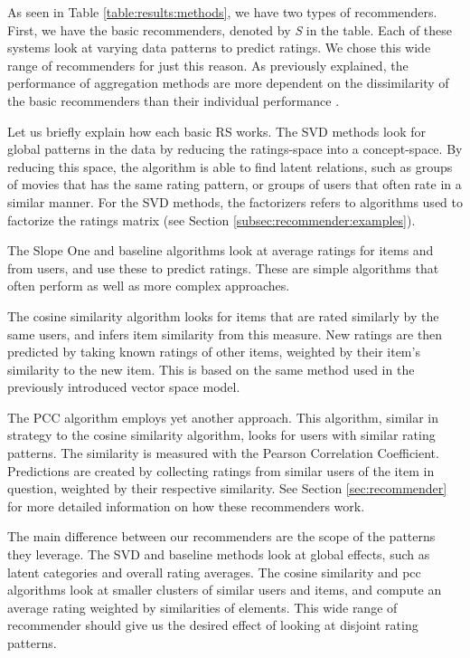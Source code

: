 As seen in Table \ref{table:results:methods}, we have two types of recommenders.
First, we have the basic recommenders, denoted by \emph{S} in the table.
Each of these systems look at varying data patterns to predict ratings.
We chose this wide range of recommenders for just this reason.
As previously explained, the performance of aggregation methods
are more dependent on the dissimilarity of the basic recommenders
than their individual performance \cite[p6]{Bell2007}.

Let us briefly explain how each basic RS works.
The SVD methods look for global patterns in the data 
by reducing the ratings-space into a concept-space.
By reducing this space, the algorithm is able to find
latent relations, such as groups of movies that has the same
rating pattern, or groups of users that often rate in a similar manner.
For the SVD methods, the factorizers refers to algorithms used to factorize the ratings matrix
(see Section \ref{subsec:recommender:examples}).

The Slope One and baseline algorithms look at average
ratings for items and from users, and use these to predict ratings.
These are simple algorithms that often perform as well
as more complex approaches.

The cosine similarity algorithm looks for items that are rated
similarly by the same users, and infers item similarity from this measure.
New ratings are then predicted by taking known ratings of other items,
weighted by their item's similarity to the new item.
This is based on the same method used in the previously introduced vector space model.

The PCC algorithm employs yet another approach. This algorithm,
similar in strategy to the cosine similarity algorithm,
looks for users with similar rating patterns.
The similarity is measured with the Pearson Correlation Coefficient.
Predictions are created by collecting ratings from similar users
of the item in question, weighted by their respective similarity.
See Section \ref{sec:recommender} for more 
detailed information on how these recommenders work. 

The main difference between our recommenders are the scope of the patterns they leverage.
The SVD and baseline methods look at global effects, such as latent categories
and overall rating averages.
The cosine similarity and pcc algorithms look at smaller clusters of similar
users and items, and compute an average rating weighted by 
similarities of elements.
This wide range of recommender should give us the desired
effect of looking at disjoint rating patterns.


